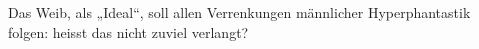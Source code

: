 Das Weib, als „Ideal“, soll allen Verrenkungen männlicher Hyperphantastik folgen: heisst das nicht zuviel verlangt?
\par

